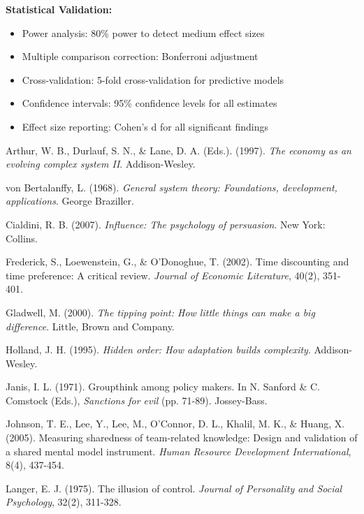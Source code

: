 \documentclass[11pt,a4paper]{article}
\begin{document}
\textbf{Statistical Validation:}
\begin{itemize}
\item Power analysis: 80\% power to detect medium effect sizes
\item Multiple comparison correction: Bonferroni adjustment
\item Cross-validation: 5-fold cross-validation for predictive models
\item Confidence intervals: 95\% confidence levels for all estimates
\item Effect size reporting: Cohen's d for all significant findings
\end{itemize}

\begin{thebibliography}{99}

Arthur, W. B., Durlauf, S. N., \& Lane, D. A. (Eds.). (1997). \textit{The economy as an evolving complex system II}. Addison-Wesley.

von Bertalanffy, L. (1968). \textit{General system theory: Foundations, development, applications}. George Braziller.

Cialdini, R. B. (2007). \textit{Influence: The psychology of persuasion}. New York: Collins.

Frederick, S., Loewenstein, G., \& O'Donoghue, T. (2002). Time discounting and time preference: A critical review. \textit{Journal of Economic Literature}, 40(2), 351-401.

Gladwell, M. (2000). \textit{The tipping point: How little things can make a big difference}. Little, Brown and Company.

Holland, J. H. (1995). \textit{Hidden order: How adaptation builds complexity}. Addison-Wesley.

Janis, I. L. (1971). Groupthink among policy makers. In N. Sanford \& C. Comstock (Eds.), \textit{Sanctions for evil} (pp. 71-89). Jossey-Bass.

Johnson, T. E., Lee, Y., Lee, M., O'Connor, D. L., Khalil, M. K., \& Huang, X. (2005). Measuring sharedness of team-related knowledge: Design and validation of a shared mental model instrument. \textit{Human Resource Development International}, 8(4), 437-454.

Langer, E. J. (1975). The illusion of control. \textit{Journal of Personality and Social Psychology}, 32(2), 311-328.


\end{thebibliography}
\end{document}
